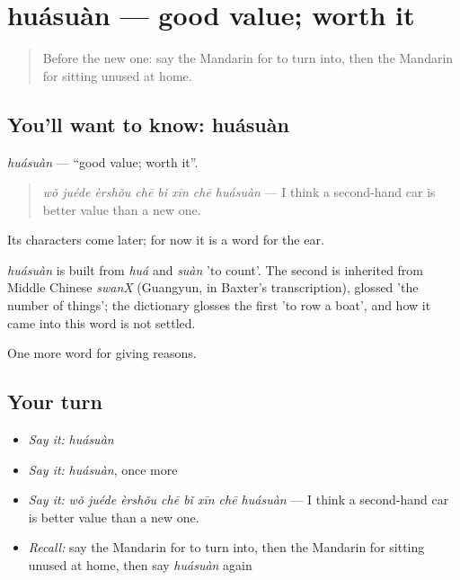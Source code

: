 \section[huásuàn]{huásuàn — good value; worth it}

\label{lesson:ZH-C386-huasuan}



\begin{quote}
Before the new one: say the Mandarin for to turn into, then the Mandarin for sitting unused at home.
\end{quote}

\subsection*{You'll want to know: huásuàn}
\emph{huásuàn} — \textquotedblleft{}good value; worth it\textquotedblright{}.

\begin{quote}
\emph{wǒ juéde èrshǒu chē bǐ xīn chē huásuàn} — I think a second-hand car is better value than a new one.
\end{quote}

Its characters come later; for now it is a word for the ear.

\begin{cousinweb}
\emph{huásuàn} is built from \emph{huá} and \emph{suàn} 'to count'. The second is inherited from Middle Chinese \emph{swanX} (Guangyun, in Baxter's transcription), glossed 'the number of things'; the dictionary glosses the first 'to row a boat', and how it came into this word is not settled.
\end{cousinweb}

\begin{grammarlens}[title={What you've built}]
One more word for giving reasons.
\end{grammarlens}

\subsection*{Your turn}
\begin{itemize}
\raggedright
  \item \emph{Say it:} \emph{huásuàn}
  \item \emph{Say it:} \emph{huásuàn}, once more
  \item \emph{Say it:} \emph{wǒ juéde èrshǒu chē bǐ xīn chē huásuàn} — I think a second-hand car is better value than a new one.
  \item \emph{Recall:} say the Mandarin for to turn into, then the Mandarin for sitting unused at home, then say \emph{huásuàn} again
\end{itemize}

